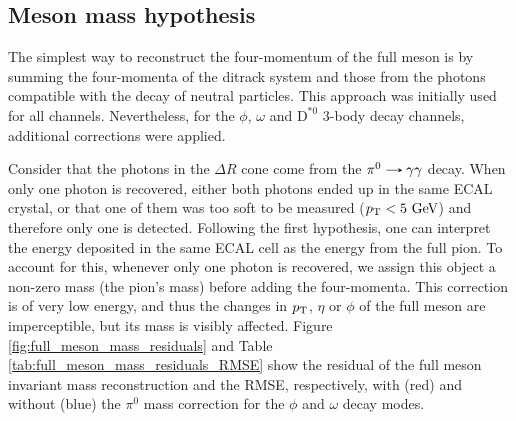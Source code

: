\subsection{Meson mass hypothesis}
The simplest way to reconstruct the four-momentum of the full meson is by summing the four-momenta of the ditrack system and those from the photons compatible with the decay of neutral particles. This approach was initially used for all channels. Nevertheless, for the $\phi$, $\omega$ and $\text{D}^{*0}$ 3-body decay channels, additional corrections were applied.

Consider that the photons in the $\Delta R$ cone come from the $\pi^{0}\decaysto\gamma\gamma$ decay. When only one photon is recovered, either both photons ended up in the same ECAL crystal, or that one of them was too soft to be measured ($p_\text{T} < 5\ \text{GeV}$) and therefore only one is detected. Following the first hypothesis, one can interpret the energy deposited in the same ECAL cell as the energy from the full pion. To account for this, whenever only one photon is recovered, we assign this object a non-zero mass (the pion's mass) before adding the four-momenta. This correction is of very low energy, and thus the changes in $p_\text{T}$, $\eta$ or $\phi$ of the full meson are imperceptible, but its mass is visibly affected. Figure \ref{fig:full_meson_mass_residuals} and Table \ref{tab:full_meson_mass_residuals_RMSE} show the residual of the full meson invariant mass reconstruction and the RMSE, respectively, with (red) and without (blue) the $\pi^0$ mass correction for the $\phi$ and $\omega$ decay modes.
